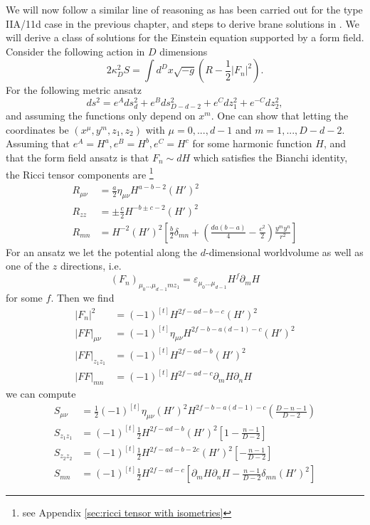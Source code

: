 We will now follow a similar line of reasoning as has been carried out for the type IIA/11d case in the previous chapter, and steps to derive brane solutions in \cite{Stelle:1998xg}.
We will derive a class of solutions for the Einstein equation supported by a form field.
Consider the following action in $D$ dimensions
\begin{equation}
2\kappa_D^2 S = \int d^D x \sqrt{-g}\left(R - \frac{1}{2}|F_n|^2\right).
\end{equation}
For the following metric ansatz
\begin{equation}
ds^2 = e^A ds_{d}^2 + e^B ds_{D-d-2}^2 + e^C dz_1^2 + e^{-C} dz_2^2,
\end{equation}
and assuming the functions only depend on $x^m$.
One can show that letting the coordinates be $(x^{\mu}, y^m, z_1, z_2)$ with $\mu = 0,...,d-1$ and $m = 1,...,D-d-2$.
Assuming that $e^A = H^a, e^B = H^b, e^C = H^c$ for some harmonic function $H$, and that the form field ansatz is that $F_n \sim dH$ which satisfies the Bianchi identity,
the Ricci tensor components are \footnote{see Appendix \ref{sec:ricci tensor with isometries}}
\begin{align}
R_{\mu\nu}
&=\frac{a}{2}\eta_{\mu\nu}H^{a-b-2}(H')^2\\
R_{zz}
&=\pm\frac{c}{2}H^{-b\pm c-2}(H')^2\\
R_{mn}
&=H^{-2}(H')^2\left[\frac{b}{2}\delta_{mn} + \left(\frac{da(b-a)}{4} - \frac{c^2}{2}\right)\frac{y^m y^n}{r^2}\right]
\end{align}
For an ansatz we let the potential along the $d$-dimensional worldvolume as well as one of the $z$ directions, i.e.
\begin{equation}
(F_n)_{\mu_0...\mu_{d-1} m z_1} = \varepsilon_{\mu_0...\mu_{d-1}}H^f \partial_m H
\end{equation}
for some $f$.
Then we find
\begin{align}
|F_n|^2 &= (-1)^{[t]}H^{2f-ad-b-c}(H')^2\\
|FF|_{\mu\nu}&=
(-1)^{[t]}\eta_{\mu\nu} H^{2f-b-a(d-1)-c}(H')^2\\
|FF|_{z_1z_1}&=(-1)^{[t]}H^{2f-ad-b}(H')^2\\
|FF|_{mn}&=(-1)^{[t]}H^{2f-ad-c}\partial_m H \partial_n H
\end{align}
we can compute
\begin{align}
S_{\mu\nu}
&=\frac{1}{2}(-1)^{[t]}\eta_{\mu\nu}(H')^2 H^{2f-b-a(d-1)-c}\left(\frac{D-n-1}{D-2}\right)\\
S_{z_1 z_1}
&=(-1)^{[t]}\frac{1}{2}H^{2f-ad-b}(H')^2\left[1-\frac{n-1}{D-2}\right]\\
S_{z_2 z_2}
&=(-1)^{[t]}\frac{1}{2}H^{2f-ad-b-2c}(H')^2\left[-\frac{n-1}{D-2}\right]\\
S_{mn}
&=(-1)^{[t]}\frac{1}{2}H^{2f-ad-c}
\left[
    \partial_m H\partial_n H - \frac{n-1}{D-2}\delta_{mn}(H')^2
\right]
\end{align}
